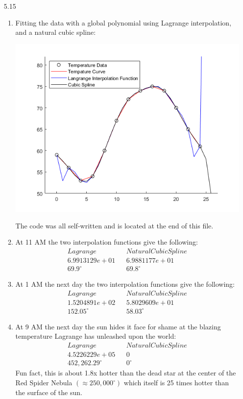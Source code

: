 \documentclass[11pt,a4paper]{article}
\begin{document}
\begin{itemize}
			\item[5.15]
				\begin{enumerate} [label={\alph*)}]
					\item Fitting the data with a global polynomial using Lagrange interpolation, and a natural cubic spline:
					\begin{center}
						\includegraphics[width=1\linewidth]{ch5q15}
					\end{center}
				The code was all self-written and is located at the end of this file.\\
				
					\item At 11 AM the two interpolation functions give the following:
					$$\begin{array}{ccc} 
					Lagrange & & Natural Cubic Spline \\
					6.9913129e+01 & & 6.9881177e+01 \\
					69.9^{\circ} & & 69.8^{\circ}
					\end{array} $$
					\item At 1 AM the next day the two interpolation functions give the following:
					$$\begin{array}{ccc} 
					Lagrange & & Natural Cubic Spline \\
					1.5204891e+02 & & 5.8029609e+01 \\
					152.05^{\circ} & & 58.03^{\circ}
					\end{array} $$
					\item At 9 AM the next day the sun hides it face for shame at the blazing temperature Lagrange has unleashed upon the world:
					$$\begin{array}{ccc} 
					Lagrange & & Natural Cubic Spline \\
					4.5226229e+05 & & 0 \\
					452,262.29^{\circ} & & 0^{\circ}
					\end{array} $$
					Fun fact, this is about 1.8x hotter than the dead star at the center of the Red Spider Nebula $(\approx 250,000^{\circ})$ which itself is 25 times hotter than the surface of the sun.
				\end{enumerate}
				

\end{itemize}
\end{document}
